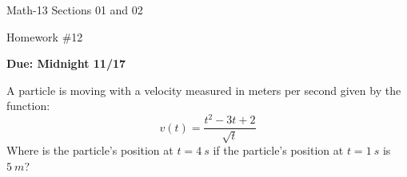 \documentclass[letterpaper,12pt,fleqn]{article}
\begin{document}
\begin{center}
  \large
  Math-13 Sections 01 and 02

  \Large
  Homework \#12

  \large
  \textbf{Due: Midnight 11/17}
\end{center}

\vspace{0.5in}

A particle is moving with a velocity measured in meters per second given by the function:
\[v(t)=\frac{t^2-3t+2}{\sqrt{t}}\]
Where is the particle's position at \(t=\SI{4}{s}\) if the particle's position at \(t=\SI{1}{s}\) is \(\SI{5}{m}\)?
\end{document}
